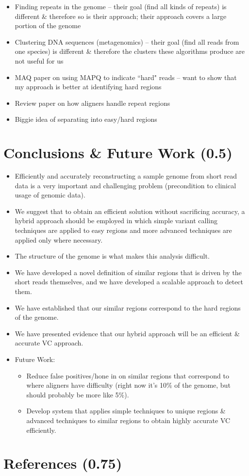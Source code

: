 \documentclass[10pt]{article}
\begin{document}
\begin{itemize}
\item{Finding repeats in the genome -- their goal (find all kinds of repeats) is different \& therefore so is their approach; their approach covers a large portion of the genome}
\item{Clustering DNA sequences (metagenomics) -- their goal (find all reads from one species) is different \& therefore the clusters these algorithms produce are not useful for us}
\item{MAQ paper on using MAPQ to indicate ``hard" reads -- want to show that my approach is better at identifying hard regions}
\item{Review paper on how aligners handle repeat regions}
\item{Biggie idea of separating into easy/hard regions}
\end{itemize}

\section{Conclusions \& Future Work (0.5)}

\begin{itemize}
\item{Efficiently and accurately reconstructing a sample genome from short read data is a very important and challenging problem (precondition to clinical usage of genomic data).}
\item{We suggest that to obtain an efficient solution without sacrificing accuracy, a hybrid approach should be employed in which simple variant calling techniques are applied to easy regions and more advanced techniques are applied only where necessary.}
\item{The structure of the genome is what makes this analysis difficult.}
\item{We have developed a novel definition of similar regions that is driven by the short reads themselves, and we have developed a scalable approach to detect them.}
\item{We have established that our similar regions correspond to the hard regions of the genome.}
\item{We have presented evidence that our hybrid approach will be an efficient \& accurate VC approach.}
\item{Future Work:}
\begin{itemize}
\item{Reduce false positives/hone in on similar regions that correspond to where aligners have difficulty (right now it's 10\% of the genome, but should probably be more like 5\%).}
\item{Develop system that applies simple techniques to unique regions \& advanced techniques to similar regions to obtain highly accurate VC efficiently.}
\end{itemize}
\end{itemize}

\section*{References (0.75)}
\end{document}
